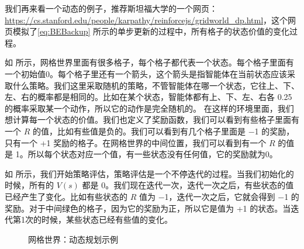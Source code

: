 我们再来看一个动态的例子，推荐斯坦福大学的一个网页：\url{https://cs.stanford.edu/people/karpathy/reinforcejs/gridworld_dp.html}，这个网页模拟了\eqref{eq:BEBackup} 所示的单步更新的过程中，所有格子的状态价值的变化过程。

如 所示，网格世界里面有很多格子，每个格子都代表一个状态。每个格子里面有一个初始值0。每个格子里还有一个箭头，这个箭头是指智能体在当前状态应该采取什么策略。我们这里采取随机的策略，不管智能体在哪一个状态，它往上、下、左、右的概率都是相同的。比如在某个状态，智能体都有上、下、左、右各 0.25 的概率采取某一个动作，所以它的动作是完全随机的。
在这样的环境里面，我们想计算每一个状态的价值。我们也定义了奖励函数，我们可以看到有些格子里面有一个 $R$ 的值，比如有些值是负的。我们可以看到有几个格子里面是 $-$1 的奖励，只有一个 +1 奖励的格子。在网格世界的中间位置，我们可以看到有一个 $R$ 的值是 1。所以每个状态对应一个值，有一些状态没有任何值，它的奖励就为0。


如 所示，我们开始策略评估，策略评估是一个不停迭代的过程。当我们初始化的时候，所有的 $V(s)$ 都是 0。我们现在迭代一次，迭代一次之后，有些状态的值已经产生了变化。比如有些状态的 $R$ 值为 $-$1，迭代一次之后，它就会得到 $-$1 的奖励。对于中间绿色的格子，因为它的奖励为正，所以它是值为 +1 的状态。当迭代第1次的时候，某些状态已经有些值的变化。

\begin{figure}[hbt]
  \centering
  \caption{网格世界：动态规划示例}
  \label{fig:}
\end{figure}


